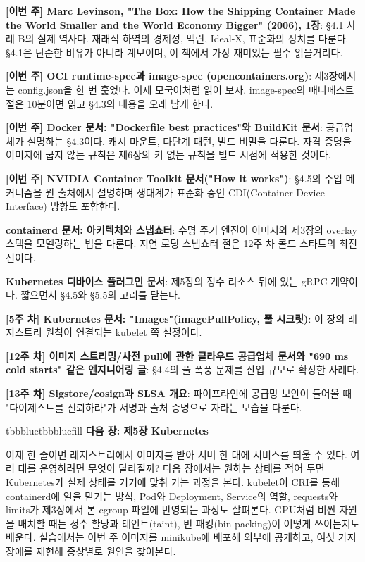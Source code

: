 \begin{tbbitemize}
  \item \textbf{[이번 주] Marc Levinson, "The Box: How the Shipping Container Made the World Smaller and the World Economy Bigger" (2006), 1장}: §4.1 사례 B의 실제 역사다. 재래식 하역의 경제성, 맥린, Ideal-X, 표준화의 정치를 다룬다. §4.1은 단순한 비유가 아니라 계보이며, 이 책에서 가장 재미있는 필수 읽을거리다.
  \item \textbf{[이번 주] OCI runtime-spec과 image-spec (opencontainers.org)}: 제3장에서는 config.json을 한 번 훑었다. 이제 모국어처럼 읽어 보자. image-spec의 매니페스트 절은 10분이면 읽고 §4.3의 내용을 오래 남게 한다.
  \item \textbf{[이번 주] Docker 문서: "Dockerfile best practices"와 BuildKit 문서}: 공급업체가 설명하는 §4.3이다. 캐시 마운트, 다단계 패턴, 빌드 비밀을 다룬다. 자격 증명을 이미지에 굽지 않는 규칙은 제6장의 키 없는 규칙을 빌드 시점에 적용한 것이다.
  \item \textbf{[이번 주] NVIDIA Container Toolkit 문서("How it works")}: §4.5의 주입 메커니즘을 원 출처에서 설명하며 생태계가 표준화 중인 CDI(Container Device Interface) 방향도 포함한다.
  \item \textbf{containerd 문서: 아키텍처와 스냅쇼터}: 수명 주기 엔진이 이미지와 제3장의 overlay 스택을 모델링하는 법을 다룬다. 지연 로딩 스냅쇼터 절은 12주 차 콜드 스타트의 최전선이다.
  \item \textbf{Kubernetes 디바이스 플러그인 문서}: 제5장의 정수 리소스 뒤에 있는 gRPC 계약이다. 짧으면서 §4.5와 §5.5의 고리를 닫는다.
  \item \textbf{[5주 차] Kubernetes 문서: "Images"(imagePullPolicy, 풀 시크릿)}: 이 장의 레지스트리 원칙이 연결되는 kubelet 쪽 설정이다.
  \item \textbf{[12주 차] 이미지 스트리밍/사전 pull에 관한 클라우드 공급업체 문서와 "690 ms cold starts" 같은 엔지니어링 글}: §4.4의 풀 폭풍 문제를 산업 규모로 확장한 사례다.
  \item \textbf{[13주 차] Sigstore/cosign과 SLSA 개요}: 파이프라인에 공급망 보안이 들어올 때 "다이제스트를 신뢰하라"가 서명과 출처 증명으로 자라는 모습을 다룬다.
\end{tbbitemize}

\vspace{5.0pt}

\begin{calloutbox}{tbbblue}{tbbbluefill}
{\normalsize\bfseries\color{tbbblue}다음 장: 제5장 Kubernetes}\par\vspace{3pt}
이제  한 줄이면 레지스트리에서 이미지를 받아 서버 한 대에 서비스를 띄울 수 있다. 여러 대를 운영하려면 무엇이 달라질까? 다음 장에서는 원하는 상태를 적어 두면 Kubernetes가 실제 상태를 거기에 맞춰 가는 과정을 본다. kubelet이 CRI를 통해 containerd에 일을 맡기는 방식, Pod와 Deployment, Service의 역할, requests와 limits가 제3장에서 본 cgroup 파일에 반영되는 과정도 살펴본다. GPU처럼 비싼 자원을 배치할 때는 정수 할당과 테인트(taint), 빈 패킹(bin packing)이 어떻게 쓰이는지도 배운다. 실습에서는 이번 주 이미지를 minikube에 배포해 외부에 공개하고, 여섯 가지 장애를 재현해 증상별로 원인을 찾아본다.
\end{calloutbox}
